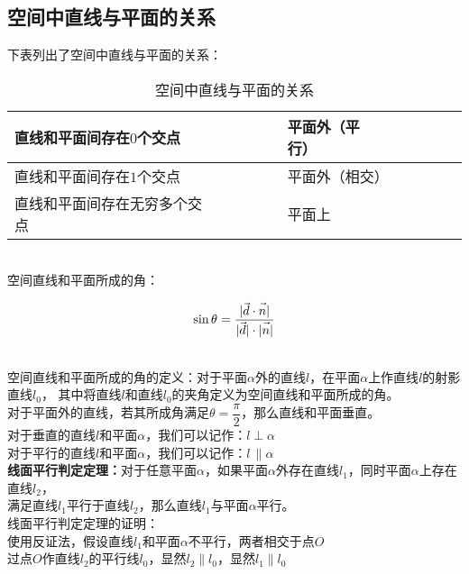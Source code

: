 \documentclass[UTF8]{ctexart}
\let\nvec\vec
\def\vec#1{\nvec{\vphantom b\smash{#1}}}
\begin{document}
\newpage

\subsection{空间中直线与平面的关系}
    下表列出了空间中直线与平面的关系：\vspace{5pt}
    \begin{table}[h]
        \begin{center}
            \begin{tabular}{l|l}
                \hline
                直线和平面间存在$0$个交点&平面外（平行）~~~~~~~~\\ \hline
                直线和平面间存在$1$个交点&平面外（相交）\\ \hline
                直线和平面间存在无穷多个交点~~~~~~~~&平面上\\ \hline
            \end{tabular}
            \caption{空间中直线与平面的关系}
        \end{center}
    \end{table}\\
    空间直线和平面所成的角：
    \begin{large}
        \begin{equation*}
            \sin{\theta}=\frac{|\vec{d}\cdot\vec{n}|}{|\vec{d}|\cdot|\vec{n}|}
        \end{equation*}
    \end{large}\\
    空间直线和平面所成的角的定义：对于平面$\alpha$外的直线$l$，在平面$\alpha$上作直线$l$的射影直线$l_0$，
    其中将直线$l$和直线$l_0$的夹角定义为空间直线和平面所成的角。\\[3mm]
    对于平面外的直线，若其所成角满足$\theta=\dfrac{\pi}{2}$，那么直线和平面垂直。\\[4mm]
    对于垂直的直线$l$和平面$\alpha$，我们可以记作：$l\perp\alpha$\\[3mm]
    对于平行的直线$l$和平面$\alpha$，我们可以记作：$l\,\parallel\alpha$\\[5mm]
    \textbf{线面平行判定定理：}对于任意平面$\alpha$，如果平面$\alpha$外存在直线$l_1$，同时平面$\alpha$上存在直线$l_2$，\\
    满足直线$l_1$平行于直线$l_2$，那么直线$l_1$与平面$\alpha$平行。\\[4mm]
    线面平行判定定理的证明：\\[3mm]
    使用反证法，假设直线$l_1$和平面$\alpha$不平行，两者相交于点$O$\\[2mm]
    过点$O$作直线$l_2$的平行线$l_0$，显然$l_2\parallel l_0$，显然$l_1\parallel l_0$\\[2mm]
\end{document}
